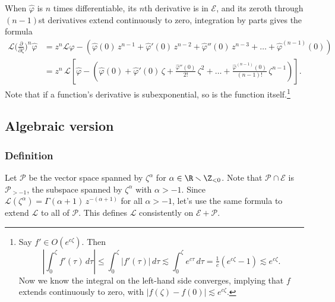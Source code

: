 \documentclass{article}
\theoremstyle{definition}
\theoremstyle{plain}
\newcommand{\laplace}{\mathcal{L}}
\begin{document}
When $\hat{\varphi}$ is $n$ times differentiable, its $n$th derivative is in $\mathcal{E}$, and its zeroth through $(n - 1)$st derivatives extend continuously to zero, integration by parts gives the formula
\begin{align}\label{id:L-diff}
\laplace \big(\tfrac{\partial}{\partial \zeta}\big)^n \hat{\varphi} & = z^n \laplace \hat{\varphi} - \left( \hat{\varphi}(0)\,z^{n-1} + \hat{\varphi}'(0)\,z^{n-2} + \hat{\varphi}''(0)\,z^{n-3} + \ldots + \hat{\varphi}^{(n-1)}(0) \right) \\
& = z^n\,\laplace\left[ \hat{\varphi} - \left( \hat{\varphi}(0) + \hat{\varphi}'(0)\,\zeta + \tfrac{\hat{\varphi}''(0)}{2!}\,\zeta^2 + \ldots + \tfrac{\hat{\varphi}^{(n-1)}(0)}{(n-1)!}\,\zeta^{n-1} \right) \right]. \nonumber
\end{align}
Note that if a function's derivative is subexponential, so is the function itself.\footnote{Say $f' \in O(e^{c\zeta})$. Then \[ \left|\int_0^\zeta f'(\tau)\,d\tau\right| \le \int_0^\zeta |f'(\tau)|\,d\tau \lesssim \int_0^\zeta e^{c\tau}\,d\tau = \tfrac{1}{c}(e^{c\zeta} - 1) \lesssim e^{c\zeta}.\] Now we know the integral on the left-hand side converges, implying that $f$ extends continuously to zero, with $|f(\zeta) - f(0)| \lesssim e^{c\zeta}$.}


\subsection{Algebraic version}
\subsubsection{Definition}
Let $\mathcal{P}$ be the vector space spanned by $\zeta^\alpha$ for $\alpha \in \R \smallsetminus \Z_{< 0}$. Note that $\mathcal{P} \cap \mathcal{E}$ is $\mathcal{P}_{> -1}$, the subspace spanned by $\zeta^\alpha$ with $\alpha > -1$. Since $\laplace(\zeta^\alpha) = \Gamma(\alpha+1)\,z^{-(\alpha + 1)}$ for all $\alpha > -1$, let's use the same formula to extend $\laplace$ to all of $\mathcal{P}$. This defines $\laplace$ consistently on $\mathcal{E} + \mathcal{P}$.
\end{document}
